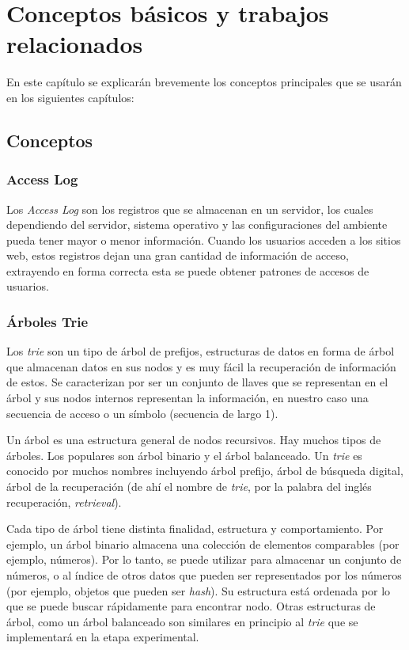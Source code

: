 \chapter[Conceptos Básicos]{Conceptos básicos y trabajos relacionados} \label{ch:Conceptos-Basicos}





En este capítulo se explicarán brevemente los conceptos principales que se usarán en los siguientes capítulos:


\section{Conceptos}

\subsection{Access Log}\label{concept-accesslog}

Los \emph{Access Log} son los registros que se almacenan en un servidor, los cuales dependiendo del servidor, sistema operativo y las configuraciones del ambiente pueda tener mayor o menor información. Cuando los usuarios acceden a los sitios web, estos registros dejan una gran cantidad de información de acceso, extrayendo en forma correcta esta  se puede obtener patrones de accesos de usuarios. 


\subsection{Árboles Trie} \label{concept-trie}

Los \emph{trie} son un tipo de árbol de prefijos, estructuras de datos en forma de árbol que almacenan datos en sus nodos y es muy fácil la recuperación de información de estos. Se caracterizan por ser un conjunto de llaves que se representan en el árbol y sus nodos internos representan la información, en nuestro caso una secuencia de acceso o un símbolo (secuencia de largo 1). 

Un árbol es una estructura general de nodos recursivos. Hay muchos tipos de árboles. Los populares son árbol binario y el árbol balanceado. Un \emph{trie} es conocido por muchos nombres incluyendo árbol prefijo, árbol de búsqueda digital, árbol de la recuperación (de ahí el nombre de \textquotedbl \emph{trie}\textquotedbl, por la palabra del inglés recuperación, \emph{retrieval}).

Cada tipo de árbol tiene distinta finalidad, estructura y comportamiento. Por ejemplo, un árbol binario almacena una colección de elementos comparables (por ejemplo, números). Por lo tanto, se puede utilizar para almacenar un conjunto de números, o al índice de otros datos que pueden ser representados por los números (por ejemplo, objetos que pueden ser \emph{hash}). Su estructura está ordenada por lo que se puede buscar rápidamente para encontrar nodo. Otras estructuras de árbol, como un árbol balanceado son similares en principio al \emph{trie} que se implementará en la etapa experimental.

